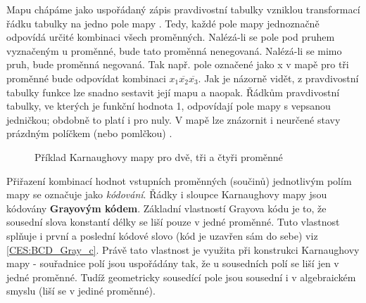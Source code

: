       Mapu chápáme jako uspořádaný zápis pravdivostní tabulky vzniklou transformací řádku tabulky na jedno pole mapy
      \cite[s.~25]{Podlesak1994}. Tedy, každé pole mapy jednoznačně odpovídá určité kombinaci všech proměnných. Nalézá-li se pole
      pod pruhem vyznačeným u proměnné, bude tato proměnná nenegovaná. Nalézá-li se mimo pruh, bude proměnná negovaná. Tak např.
      pole označené jako x v mapě pro tři proměnné bude odpovídat kombinaci $x_1\overline{x_2}\overline{x_3}$. Jak je názorně
      vidět, z pravdivostní tabulky funkce lze snadno sestavit její mapu a naopak. Řádkům pravdivostní tabulky, ve kterých je
      funkční hodnota 1, odpovídají pole mapy s vepsanou jedničkou; obdobně to platí i pro nuly. V mapě lze znázornit i neurčené
      stavy prázdným políčkem (nebo pomlčkou) \cite[s.~219]{Wakerly1999}.
       
      \begin{figure}[hb!]
          \centering
        \caption{Příklad Karnaughovy mapy pro dvě, tři a čtyři proměnné}\label{CES:karnaugh_234}
      \end{figure}     
      
      Přiřazení kombinací hodnot vstupních proměnných (součinů) jednotlivým polím mapy se označuje jako \emph{kódování}. Řádky i
      sloupce Karnaughovy mapy jsou kódovány \textbf{Grayovým kódem}. Základní vlastností Grayova kódu je to, že sousední slova
      konstantí délky se liší pouze v jedné proměnné. Tuto vlastnost splňuje i první a poslední kódové slovo (kód je uzavřen sám
      do sebe) viz \ref{CES:BCD_Gray_c}. Právě tato vlastnost je využita při konstrukci Karnaughovy mapy - souřadnice polí jsou
      uspořádány tak, že u sousedních polí se liší jen v jedné proměnné. Tudíž geometricky sousedící pole jsou sousední i v 
      algebraickém smyslu (liší se v jediné proměnné).  
      
